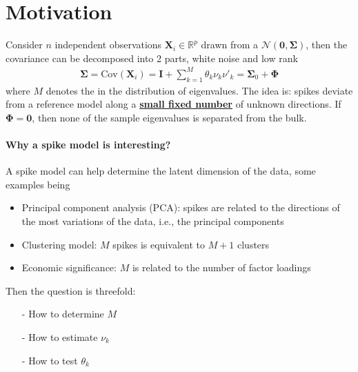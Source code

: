 \documentclass[twoside]{article}
\begin{document}

\section{Motivation}
Consider $n$ independent observations $\mathbf{X}_i\in \mathbb{R}^p$ drawn from a $\mathcal{N}(\mathbf{0},\boldsymbol{\Sigma})$, then the covariance can be decomposed into 2 parts, white noise and low rank
\begin{align*}
    \boldsymbol{\Sigma} = \mathrm{Cov}(\mathbf{X}_i) = \mathbf{I} + \sum^M_{k=1}\theta_k \nu_k\nu'_k =\boldsymbol{\Sigma}_0 + \boldsymbol{\Phi}
\end{align*}
where $M$ denotes the  in the distribution of eigenvalues. The idea is: spikes deviate from a reference model along a \textbf{\underline{small fixed number}} of unknown directions. If $\boldsymbol{\Phi}=\mathbf{0}$, then none of the sample eigenvalues is separated from the bulk.

\paragraph*{Why a spike model is interesting?} A spike model can help determine the latent dimension of the data, some examples being
\begin{itemize}
    \item Principal component analysis (PCA): spikes are related to the directions of the most variations of the data, i.e., the principal components
    \item Clustering model: $M$ spikes is equivalent to $M+1$ clusters
    \item Economic significance: $M$ is related to the number of factor loadings
\end{itemize}

Then the question is threefold: 
\begin{itemize}
    \item[-] How to determine $M$
    \item[-] How to estimate $\nu_k$
    \item[-] How to test $\theta_k$
\end{itemize}
\end{document}
